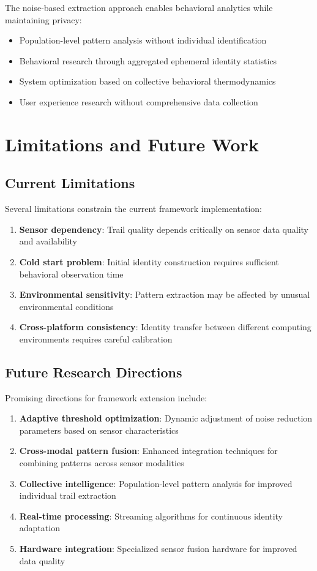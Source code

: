 \documentclass[12pt,a4paper]{article}
\begin{document}
The noise-based extraction approach enables behavioral analytics while maintaining privacy:

\begin{itemize}
\item Population-level pattern analysis without individual identification
\item Behavioral research through aggregated ephemeral identity statistics
\item System optimization based on collective behavioral thermodynamics
\item User experience research without comprehensive data collection
\end{itemize}

\section{Limitations and Future Work}

\subsection{Current Limitations}

Several limitations constrain the current framework implementation:

\begin{enumerate}
\item \textbf{Sensor dependency}: Trail quality depends critically on sensor data quality and availability
\item \textbf{Cold start problem}: Initial identity construction requires sufficient behavioral observation time
\item \textbf{Environmental sensitivity}: Pattern extraction may be affected by unusual environmental conditions
\item \textbf{Cross-platform consistency}: Identity transfer between different computing environments requires careful calibration
\end{enumerate}

\subsection{Future Research Directions}

Promising directions for framework extension include:

\begin{enumerate}
\item \textbf{Adaptive threshold optimization}: Dynamic adjustment of noise reduction parameters based on sensor characteristics
\item \textbf{Cross-modal pattern fusion}: Enhanced integration techniques for combining patterns across sensor modalities
\item \textbf{Collective intelligence}: Population-level pattern analysis for improved individual trail extraction
\item \textbf{Real-time processing}: Streaming algorithms for continuous identity adaptation
\item \textbf{Hardware integration}: Specialized sensor fusion hardware for improved data quality
\end{enumerate}
\end{document}
